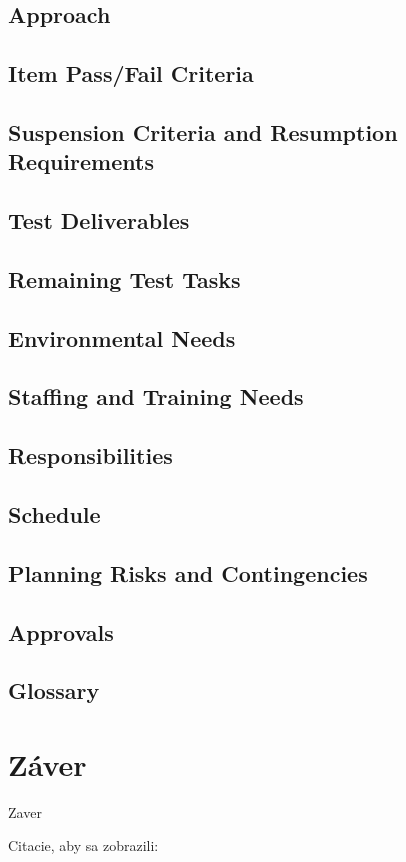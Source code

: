 \section{Approach}
\section{Item Pass/Fail Criteria}
\section{Suspension Criteria and Resumption Requirements}
\section{Test Deliverables}
\section{Remaining Test Tasks}
\section{Environmental Needs}
\section{Staffing and Training Needs}
\section{Responsibilities}
\section{Schedule}
\section{Planning Risks and Contingencies}
\section{Approvals}
\section{Glossary}

\chapter{}

\chapter{Záver}
Zaver

Citacie, aby sa zobrazili: \cite{Testovani_softwaru} \cite{Software_testing} \cite{Software_testing_patton}

